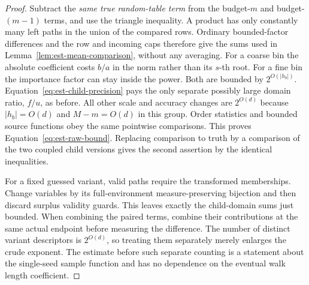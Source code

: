 \begin{proof}
Subtract the \emph{same true random-table term} from the budget-$m$
and budget-$(m-1)$ terms, and use the triangle inequality.  A product has
only constantly many left paths in the union of the compared rows.
Ordinary bounded-factor differences and the row and incoming caps
therefore give the sums used in
Lemma~\ref{lem:est-mean-comparison}, without any averaging.  For a coarse
bin the absolute coefficient costs $b/a$ in the norm rather than its
$s$-th root.  For a fine bin the importance factor can stay inside the
power.  Both are bounded by $2^{O(|h_b|)}$.  Equation~\eqref{eq:est-child-precision}
pays the only separate possibly large domain ratio, $f/u$, as before.
All other scale and accuracy changes are $2^{O(d)}$ because
$|h_b|=O(d)$ and $M-m=O(d)$ in this group.  Order statistics and bounded source
functions obey the same pointwise comparisons.  This proves
Equation~\eqref{eq:est-raw-bound}.  Replacing comparison to truth by a
comparison of the two coupled child versions gives the second assertion
by the identical inequalities.

For a fixed guessed variant, valid paths require the transformed
memberships.  Change variables by its full-environment measure-preserving
bijection and then discard surplus validity guards.  This leaves exactly
the child-domain sums just bounded.  When combining the paired terms,
combine their contributions at the same actual endpoint before measuring
the difference.  The number of distinct variant descriptors is
$2^{O(d)}$, so treating them separately merely enlarges the crude exponent.
The estimate before such separate counting is a statement about the
single-seed sample function and has no dependence on the eventual walk
length coefficient.
\end{proof}

